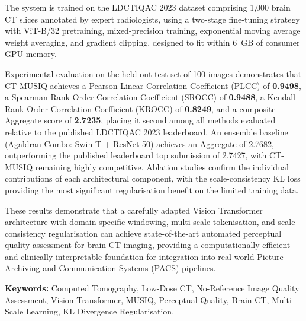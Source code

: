 The system is trained on the LDCTIQAC 2023 dataset comprising 1,000 brain CT slices
annotated by expert radiologists, using a two-stage fine-tuning strategy with ViT-B/32
pretraining, mixed-precision training, exponential moving average weight averaging, and
gradient clipping, designed to fit within 6~GB of consumer GPU memory.

Experimental evaluation on the held-out test set of 100 images demonstrates that CT-MUSIQ
achieves a Pearson Linear Correlation Coefficient (PLCC) of \textbf{0.9498}, a Spearman
Rank-Order Correlation Coefficient (SROCC) of \textbf{0.9488}, a Kendall Rank-Order
Correlation Coefficient (KROCC) of \textbf{0.8249}, and a composite Aggregate score of
\textbf{2.7235}, placing it second among all methods evaluated relative to the published
LDCTIQAC 2023 leaderboard. An ensemble baseline (Agaldran Combo: Swin-T + ResNet-50)
achieves an Aggregate of 2.7682, outperforming the published leaderboard top submission
of 2.7427, with CT-MUSIQ remaining highly competitive. Ablation studies confirm the
individual contributions of each architectural component, with the scale-consistency KL
loss providing the most significant regularisation benefit on the limited training data.

These results demonstrate that a carefully adapted Vision Transformer architecture with
domain-specific windowing, multi-scale tokenisation, and scale-consistency regularisation
can achieve state-of-the-art automated perceptual quality assessment for brain CT imaging,
providing a computationally efficient and clinically interpretable foundation for
integration into real-world Picture Archiving and Communication Systems (PACS) pipelines.

\vspace{0.5cm}
\noindent\textbf{Keywords:} Computed Tomography, Low-Dose CT, No-Reference Image Quality
Assessment, Vision Transformer, MUSIQ, Perceptual Quality, Brain CT, Multi-Scale Learning,
KL Divergence Regularisation.

